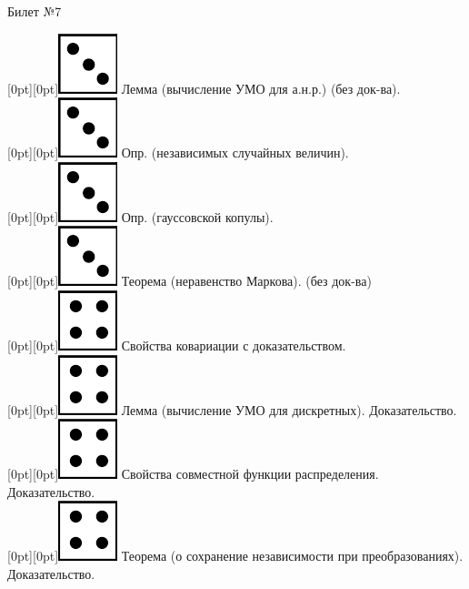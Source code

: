 \documentclass[10pt]{article}
\begin{document}
\begin{center} {\Large Билет №7} \end{center} 

\raisebox{-1pt}[0pt][0pt]{\includegraphics[width=0.02\linewidth]{3.png}} Лемма (вычисление УМО для а.н.р.)  (без док-ва). \\

\raisebox{-1pt}[0pt][0pt]{\includegraphics[width=0.02\linewidth]{3.png}} Опр. (независимых случайных величин). \\

\raisebox{-1pt}[0pt][0pt]{\includegraphics[width=0.02\linewidth]{3.png}} Опр. (гауссовской копулы). \\

\raisebox{-1pt}[0pt][0pt]{\includegraphics[width=0.02\linewidth]{3.png}} Теорема (неравенство Маркова). (без док-ва) \\

\raisebox{-1pt}[0pt][0pt]{\includegraphics[width=0.02\linewidth]{4.png}} Свойства ковариации с доказательством. \\

\raisebox{-1pt}[0pt][0pt]{\includegraphics[width=0.02\linewidth]{4.png}} Лемма (вычисление УМО для дискретных). Доказательство. \\

\raisebox{-1pt}[0pt][0pt]{\includegraphics[width=0.02\linewidth]{4.png}} Свойства совместной функции распределения. Доказательство. \\

\raisebox{-1pt}[0pt][0pt]{\includegraphics[width=0.02\linewidth]{4.png}} Теорема (о сохранение независимости при преобразованиях). Доказательство. \\ 
\end{document}
